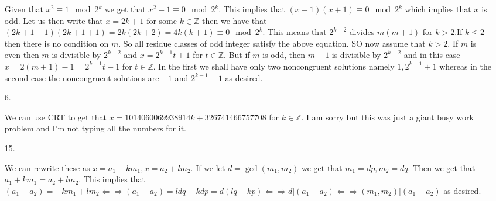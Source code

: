 \documentclass{article}
\theoremstyle{definition}
\newcommand{\Z}{\mathbb{Z}}
\begin{document}
\begin{enumerate}
    Given that $x^2\equiv 1 \mod 2^k$ we get that $x^2-1\equiv 0 \mod 2^k$. This implies that $(x-1)(x+1)\equiv 0 \mod 2^k$ which implies that $x$ is odd. Let us then write that $x = 2k + 1$ for some $k\in \Z$ then we have that $(2k+1-1)(2k+1+1) = 2k(2k+2) = 4k(k+1)\equiv 0\mod 2^k$. This means that $2^{k-2}$ divides $m(m+1)$ for $k>2.$If $k\leq 2$ then there is no condition on $m$. So all residue classes of odd integer satisfy the above equation. SO now assume that $k>2$. If $m$ is even then $m$ is divisible by $2^{k-2}$ and $x = 2^{k-1}t+1$ for $t\in \Z$. But if $m$ is odd, then $m+1$ is divisible by $2^{k-2}$ and in this case $x = 2(m+1)-1 = 2^{k-1}t-1$ for $t\in \Z$. In the first we shall have only two noncongruent solutions namely $1, 2^{k-1} + 1$ whereas in the second case the noncongruent solutions are $-1$ and $2^{k-1} - 1$ as desired.
    
    \item [6. ]
    
    We can use CRT to get that $x = 1014060069938914k+326741466757708$ for $k\in \Z$. I am sorry but this was just a giant busy work problem and I'm not typing all the numbers for it.
    
    \item [15. ]
    
    We can rewrite these as $x = a_1+km_1, x = a_2 + lm_2$. If we let $d = \gcd(m_1, m_2)$ we get that $m_1 = dp, m_2 = dq$. Then we get that $a_1+km_1 = a_2 + lm_2.$ This implies that $(a_1-a_2) = -km_1 + lm_2 \Leftarrow\Rightarrow (a_1-a_2) = ldq-kdp = d(lq-kp) \Leftarrow\Rightarrow d|(a_1-a_2) \Leftarrow\Rightarrow (m_1,m_2)|(a_1-a_2)$ as desired.
    
\end{enumerate}
\end{document}
